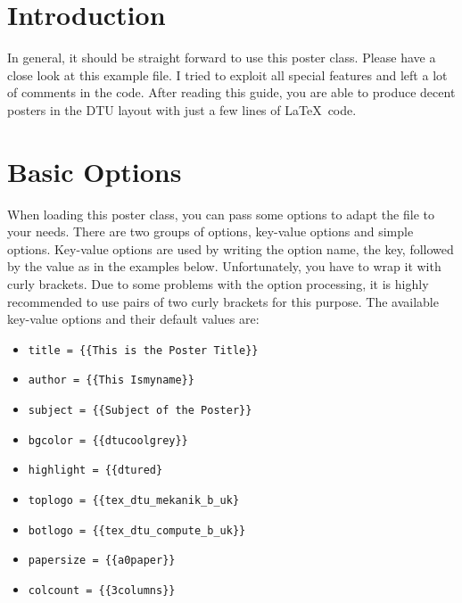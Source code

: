 \documentclass[
]{dtuposter}
\begin{document}
%
%
\begin{dtuposterhead} %
\end{dtuposterhead}
%
%
\begin{dtupostercontent}
\section{Introduction}
In general, it should be straight forward to use this poster class. Please
have a close look at this example file. I tried to exploit all special 
features and left a lot of comments in the code. After reading this 
guide, you are able to produce decent posters in the DTU layout with
just a few lines of \LaTeX\ code. 

\section{Basic Options}
When loading this poster class, you can pass some options to adapt the 
file to your needs. There are two groups of options, key-value options 
and simple options. Key-value options are used by writing the option 
name, the key, followed by the value as in the examples below. 
Unfortunately, you have to
wrap it with curly brackets. Due to some problems with the option 
processing, it is highly recommended to use pairs of two curly brackets
for this purpose. The available key-value options and their 
default values are:
\begin{itemize}
\item \texttt{title     = \{\{This is the Poster Title\}\}}
\item \texttt{author    = \{\{This Ismyname\}\}}
\item \texttt{subject   = \{\{Subject of the Poster\}\}}
\item \texttt{bgcolor   = \{\{dtucoolgrey\}\}}
\item \texttt{highlight = \{\{dtured\}}
\item \texttt{toplogo   = \{\{tex\_dtu\_mekanik\_b\_uk\}}
\item \texttt{botlogo   = \{\{tex\_dtu\_compute\_b\_uk\}\}}
\item \texttt{papersize = \{\{a0paper\}\}}
\item \texttt{colcount  = \{\{3columns\}\}}
\end{itemize}


\end{dtupostercontent}
\end{document}
